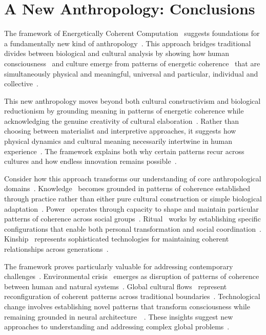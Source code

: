 \section{A New Anthropology: Conclusions}

The framework of Energetically Coherent Computation~ suggests foundations for a fundamentally new kind of anthropology~\cite{rabinow2008marking, fischer2018anthropology}. This approach bridges traditional divides between biological and cultural analysis by showing how human consciousness~ and culture emerge from patterns of energetic coherence~ that are simultaneously physical and meaningful, universal and particular, individual and collective~\cite{bloch2012anthropology}.

This new anthropology moves beyond both cultural constructivism and biological reductionism by grounding meaning in patterns of energetic coherence while acknowledging the genuine creativity of cultural elaboration~\cite{strathern2004commons, latour2005reassembling}. Rather than choosing between materialist and interpretive approaches, it suggests how physical dynamics and cultural meaning necessarily intertwine in human experience~\cite{csordas1990embodiment}. The framework explains both why certain patterns recur across cultures and how endless innovation remains possible~\cite{wagner2016invention}.

Consider how this approach transforms our understanding of core anthropological domains~\cite{fischer2018anthropology}. Knowledge~ becomes grounded in patterns of coherence established through practice rather than either pure cultural construction or simple biological adaptation~\cite{ingold2013making}. Power~ operates through capacity to shape and maintain particular patterns of coherence across social groups~\cite{wolf1999envisioning}. Ritual~ works by establishing specific configurations that enable both personal transformation and social coordination~\cite{kapferer2004ritual}. Kinship~ represents sophisticated technologies for maintaining coherent relationships across generations~\cite{carsten2004after, strathern1992after}.

The framework proves particularly valuable for addressing contemporary challenges~\cite{latour2017facing, tsing2015mushroom}. Environmental crisis~ emerges as disruption of patterns of coherence between human and natural systems~\cite{kohn2013how}. Global cultural flows~ represent reconfiguration of coherent patterns across traditional boundaries~\cite{appadurai1996modernity}. Technological change involves establishing novel patterns that transform consciousness while remaining grounded in neural architecture~~\cite{hayles2012how}. These insights suggest new approaches to understanding and addressing complex global problems~\cite{fortun2012ethnography}.

